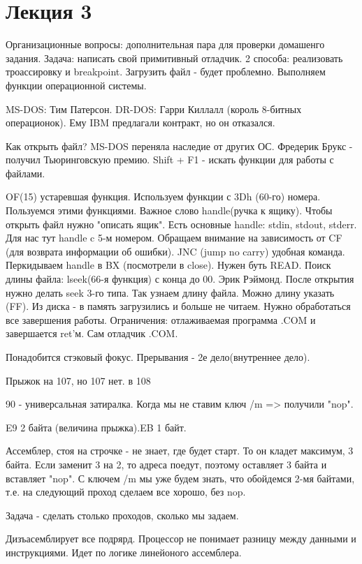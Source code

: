 \section{Лекция 3}
Организационные вопросы: дополнительная пара для проверки домашенго задания. 
Задача: написать свой примитивный отладчик. 2 способа: реализовать троассировку и breakpoint. Загрузить файл - будет проблемно. Выполняем функции операционной системы. 

MS-DOS: Тим Патерсон.
DR-DOS: Гарри Киллалл (король 8-битных операционок). Ему IBM предлагали контракт, но он отказался.

Как открыть файл? MS-DOS переняла наследие от других ОС. Фредерик Брукс - получил Тьюринговскую премию. Shift + F1 - искать функции для работы с файлами. 

OF(15) устаревшая функция. Используем функции с 3Dh (60-го) номера. Пользуемся этими функциями. Важное слово handle(ручка к ящику). Чтобы открыть файл нужно "описать ящик". Есть основные handle: stdin, stdout, stderr. Для нас тут handle c 5-м номером. Обращаем внимание на зависимость от CF (для возврата информации об ошибки). JNC (jump no carry) удобная команда. Перкидываем handle в BX (посмотрели в close). Нужен буть READ. Поиск длины файла: lseek(66-я функция) с конца до 00. Эрик Рэймонд. После открытия нужно делать seek 3-го типа. Так узнаем длину файла. Можно длину указать (FF). Из диска - в память загрузились и больше не читаем. Нужно обработаться все завершения работы.
Ограничения: отлаживаемая программа .COM и завершается ret'м. Сам отладчик .COM.

Понадобится стэковый фокус. Прерывания - 2е дело(внутреннее дело). 

Прыжок на 107, но 107 нет. в 108

90 - универсальная затиралка. Когда мы не ставим ключ /m => получили "nop".

E9 2 байта (величина прыжка).EB 1 байт.

Ассемблер, стоя на строчке - не знает, где будет старт. То он кладет максимум, 3 байта. Если заменит 3 на 2, то адреса поедут, поэтому оставляет 3 байта и вставляет "nop". С ключем /m мы уже будем знать, что обойдемся 2-мя байтами, т.е. на следующий проход сделаем все хорошо, без nop.

\begin{hw} Задача - сделать столько проходов, сколько мы задаем.\end{hw}

Дизъасемблирует все подрярд. Процессор не понимает разницу между данными и инструкциями. Идет по логике линейоного ассемблера. 


